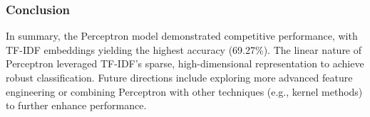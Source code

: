 \subsubsection{Conclusion}

In summary, the Perceptron model demonstrated competitive performance, with TF-IDF embeddings yielding the highest accuracy (69.27\%). The linear nature of Perceptron leveraged TF-IDF’s sparse, high-dimensional representation to achieve robust classification. Future directions include exploring more advanced feature engineering or combining Perceptron with other techniques (e.g., kernel methods) to further enhance performance.

\newpage